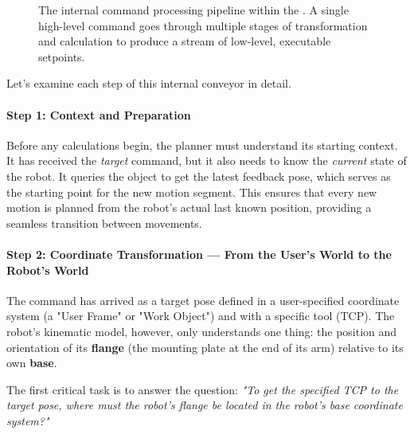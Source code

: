 \begin{figure}[h!]
\begin{tcolorbox}[
        width=\textwidth,
        halign=center,
        title=The TrajectoryPlanner's Internal Processing Pipeline,
        fonttitle=\bfseries
    ]
    \end{tcolorbox}
    \caption{The internal command processing pipeline within the . A single high-level command goes through multiple stages of transformation and calculation to produce a stream of low-level, executable setpoints.}
    \label{fig:planner_pipeline}
\end{figure}

Let's examine each step of this internal conveyor in detail.

\paragraph{Step 1: Context and Preparation}
Before any calculations begin, the planner must understand its starting context. It has received the \textit{target} command, but it also needs to know the \textit{current} state of the robot. It queries the  object to get the latest feedback pose, which serves as the starting point for the new motion segment. This ensures that every new motion is planned from the robot's actual last known position, providing a seamless transition between movements.

\paragraph{Step 2: Coordinate Transformation — From the User's World to the Robot's World}
The command has arrived as a target pose defined in a user-specified coordinate system (a "User Frame" or "Work Object") and with a specific tool (TCP). The robot's kinematic model, however, only understands one thing: the position and orientation of its \textbf{flange} (the mounting plate at the end of its arm) relative to its own \textbf{base}.

The first critical task is to answer the question: \textit{"To get the specified TCP to the target pose, where must the robot's flange be located in the robot's base coordinate system?"}

